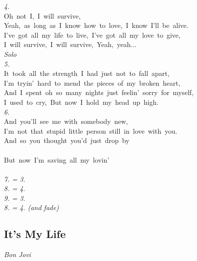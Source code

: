 \documentclass[10pt,twocolumn,a4paper]{article}
\begin{document}
\textit{4.}\\
{Oh~not~I,~I~will~survive,~}\\
{Yeah,~as~long~as~I~know~how~to~love,~I~know~I'll~be~alive.~}\\
{I've~got~all~my~life~to~live,~I've~got~all~my~love~to~give,~}\\
{I~will~survive,~I~will~survive,~Yeah,~yeah...}\\

\textit{Solo}\\

\textit{5.}\\
{It~took~all~the~strength~I~had~just~not~to~fall~apart,~~}\\
{I’m~tryin'~hard~to~mend~the~pieces~of~my~broken~heart,~}\\
{And~I~spent~oh~so~many~nights~just~feelin'~sorry~for~myself,~}\\
{I~used~to~cry,~But~now~I~hold~my~head~up~high.~}\\

\textit{6.}\\
{And~you’ll~see~me~with~somebody~new,~}\\
{I'm~not~that~stupid~little~person~still~in~love~with~you.~}\\
{And~so~you~thought~you’d~just~drop~by}\\
\hspace*{}\\
{But~now~I'm~saving~all~my~lovin'}\\
\hspace*{}\\

\textit{7. = 3.}\\

\textit{8. = 4.}\\

\textit{9. = 3.}\\

\textit{8. = 4. (and fade)}\\

\newpage{}
\begin{center} \section*{It's My Life}\end{center}
\begin{center}\it Bon Jovi\end{center}
\end{document}
